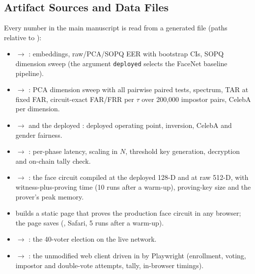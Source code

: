 \documentclass[10pt,letterpaper,journal]{IEEEtran}
\begin{document}
\subsection{Artifact Sources and Data Files}
Every number in the main manuscript is read from a generated file (paths relative to ):
\begin{itemize}[leftmargin=*,noitemsep]
  \item {} $\rightarrow$ : embeddings, raw/PCA/SOPQ EER with bootstrap CIs, SOPQ dimension sweep (the argument \texttt{deployed} selects the FaceNet baseline pipeline).
  \item {} $\rightarrow$ : PCA dimension sweep with all pairwise paired tests, spectrum, TAR at fixed FAR, circuit-exact FAR/FRR per $\tau$ over 200,000 impostor pairs, CelebA per dimension.
  \item {} $\rightarrow$  and the deployed : deployed operating point, inversion, CelebA and gender fairness.
  \item {} $\rightarrow$ : per-phase latency, scaling in $N$, threshold key generation, decryption and on-chain tally check.
  \item {} $\rightarrow$ : the face circuit compiled at the deployed 128-D and at raw 512-D, with witness-plus-proving time (10 runs after a warm-up), proving-key size and the prover's peak memory.
  \item {} builds a static page that proves the production face circuit in any browser; the page saves  (\nPhoneDevice, Safari, 5 runs after a warm-up).
  \item {} $\rightarrow$ : the 40-voter election on the live network.
  \item {} $\rightarrow$ : the unmodified web client driven in \nBrowserName{} by Playwright (enrollment, voting, impostor and double-vote attempts, tally, in-browser timings).

\end{itemize}
\end{document}
